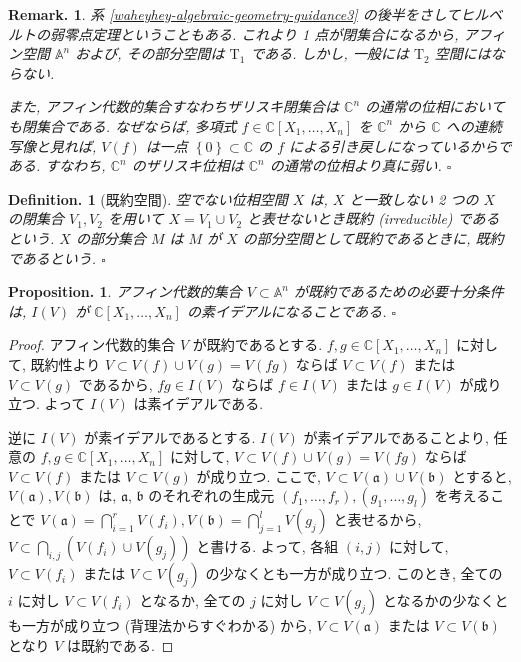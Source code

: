 \documentclass[openany, a4paper, oneside]{jsbook}
\theoremstyle{break}
\theoremstyle{breakdefn}
\newtheorem{prop}[thm]{Proposition.}
\newtheorem{defn}[thm]{Definition.}
\newtheorem{rem}[thm]{Remark.}
\newcommand{\cbk}[1]{\left\{#1\right\}}
\newcommand{\fin}{\hfill $\square$ \par}
\begin{document}
\begin{rem}
系 \ref{waheyhey-algebraic-geometry-guidance3} の後半をさしてヒルベルトの弱零点定理ということもある.
これより 1 点が閉集合になるから, アフィン空間 $\mathbb{A}^n$ および, その部分空間は $\mathrm{T}_1$ である.
しかし, 一般には $\mathrm{T}_2$ 空間にはならない.

また, アフィン代数的集合すなわちザリスキ閉集合は $\mathbb{C}^n$ の通常の位相においても閉集合である.
なぜならば, 多項式 $f \in \mathbb{C}[X_1, \dots, X_n]$ を $\mathbb{C}^n$ から $\mathbb{C}$ への連続写像と見れば,
$V ( f )$ は一点 $\cbk{0} \subset \mathbb{C}$ の $f$ による引き戻しになっているからである.
すなわち,  $\mathbb{C}^n$ のザリスキ位相は $\mathbb{C}^n$ の通常の位相より真に弱い. \fin
\end{rem}

\begin{defn}[既約空間]
空でない位相空間 $X$ は, $X$ と一致しない 2 つの $X$ の閉集合 $V_1, V_2$ を用いて $X= V_1 \cup V_2$ と表せないとき既約 (irreducible) であるという.
$X$ の部分集合 $M$ は $M$ が $X$ の部分空間として既約であるときに, 既約であるという. \fin
\end{defn}
\begin{prop}\label{waheyhey-algebraic-geometry-guidance4}
 アフィン代数的集合 $V \subset \mathbb{A}^n$ が既約であるための必要十分条件は,
 $I ( V )$ が $\mathbb{C}[X_1, \dots, X_n]$ の素イデアルになることである. \fin
\end{prop}
\begin{proof}
アフィン代数的集合 $V$ が既約であるとする.
$f, g \in \mathbb{C}[X_1, \dots, X_n]$ に対して,
既約性より $V \subset V ( f ) \cup V ( g ) = V (fg)$ ならば $V \subset V ( f )$ または $V \subset V ( g )$ であるから,
$fg \in I ( V )$ ならば $f \in I (V)$ または $g \in I (V)$ が成り立つ.
よって $I ( V )$ は素イデアルである.

逆に $I (V)$ が素イデアルであるとする.
$I (V)$ が素イデアルであることより, 任意の $ f, g \in \mathbb{C}[X_1, \dots, X_n]$ に対して,
$V \subset V ( f ) \cup V ( g ) = V (fg)$ ならば $V \subset V (f)$ または $V \subset V (g)$ が成り立つ.
ここで, $V \subset V ( \mathfrak{a} ) \cup V ( \mathfrak{b} )$ とすると,
$V ( \mathfrak{a} ), V ( \mathfrak{b} )$ は,  $\mathfrak{a}$, $\mathfrak{b}$ のそれぞれの生成元
$(f_1, \dots, f_r) , (g_1, \dots, g_l)$ を考えることで
$V ( \mathfrak{a} ) = \bigcap_{i=1}^r V ( f_i ) , V ( \mathfrak{b} ) = \bigcap_{j=1}^l V ( g_j )$ と表せるから,
$V \subset \bigcap_{i, j} \left ( V ( f_i ) \cup V (g_j) \right)$ と書ける.
よって, 各組 $( i, j )$ に対して, $V \subset V (f_i)$ または $V \subset V (g_j)$ の少なくとも一方が成り立つ.
このとき, 全ての $i$ に対し $V \subset V ( f_i)$ となるか,
全ての $j$ に対し $V \subset V ( g_j )$ となるかの少なくとも一方が成り立つ (背理法からすぐわかる) から,
$V \subset V ( \mathfrak{a} )$ または $V \subset V ( \mathfrak{b} )$ となり $V$ は既約である.
\end{proof}
\end{document}
